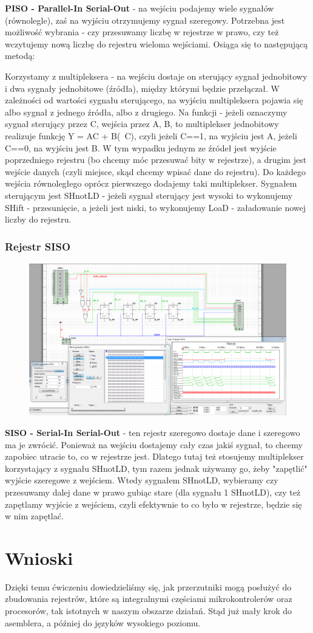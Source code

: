 \documentclass[12pt,a4paper]{article}
\begin{document}
\textbf{PISO - Parallel-In Serial-Out} - na wejściu podajemy wiele sygnałów (równolegle), zaś na wyjściu otrzymujemy sygnał szeregowy. Potrzebna jest  możliwość wybrania - czy przesuwamy liczbę w rejestrze w prawo, czy też wczytujemy nową liczbę do rejestru wieloma wejściami. Osiąga się to następującą metodą:


Korzystamy z multipleksera - na wejściu dostaje on sterujący sygnał jednobitowy i dwa sygnały jednobitowe (źródła), między którymi będzie przełączał. W zależności od wartości sygnału sterującego, na wyjściu multipleksera pojawia się albo sygnał z jednego źródła, albo z drugiego. Na funkcji - jeżeli oznaczymy sygnał sterujący przez C, wejścia przez A, B, to multiplekser jednobitowy realizuje funkcję Y = AC + B(~C), czyli jeżeli C==1, na wyjściu jest A, jeżeli C==0, na wyjściu jest B.
W tym wypadku jednym ze źródeł jest wyjście poprzedniego rejestru (bo chcemy móc przesuwać bity w rejestrze), a drugim jest wejście danych (czyli miejsce, skąd chcemy wpisać dane do rejestru). 
Do każdego wejścia równoległego oprócz pierwszego dodajemy taki multiplekser. Sygnałem sterującym jest SHnotLD - jeżeli sygnał sterujący jest wysoki to wykonujemy SHift - przesunięcie, a jeżeli jest niski, to wykonujemy LoaD - załadowanie nowej liczby do rejestru.

\subsubsection{Rejestr SISO}
\begin{figure}[H]
\centering
\includegraphics[width=\textwidth]{img/3hSISO}
\end{figure}

\textbf{SISO - Serial-In Serial-Out} - ten rejestr szeregowo dostaje dane i szeregowo ma je zwrócić. Ponieważ na wejściu dostajemy cały czas jakiś sygnał, to chcemy zapobiec utracie to, co w rejestrze jest. Dlatego tutaj też stosujemy multiplekser korzystający z sygnału SHnotLD, tym razem jednak używamy go, żeby "zapętlić" wyjście szeregowe z wejściem. Wtedy sygnałem SHnotLD, wybieramy czy przesuwamy dalej dane w prawo gubiąc stare (dla sygnału 1 SHnotLD), czy też zapętlamy wyjście z wejściem, czyli efektywnie to co było w rejestrze, będzie się w nim zapętlać.



\section{Wnioski}
Dzięki temu ćwiczeniu dowiedzieliśmy się, jak przerzutniki mogą posłużyć do zbudowania rejestrów, które są integralnymi częściami mikrokontrolerów oraz procesorów, tak istotnych w naszym obszarze działań. Stąd już mały krok do asemblera, a później do języków wysokiego poziomu.
\end{document}
